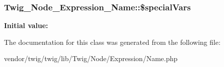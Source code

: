 \subsubsection[{\texorpdfstring{\$special\+Vars}{$specialVars}}]{\setlength{\rightskip}{0pt plus 5cm}Twig\+\_\+\+Node\+\_\+\+Expression\+\_\+\+Name\+::\$special\+Vars\hspace{0.3cm}{\ttfamily [protected]}}\hypertarget{classTwig__Node__Expression__Name_a934d8c519b8997a7880693992464975c}{}\label{classTwig__Node__Expression__Name_a934d8c519b8997a7880693992464975c}
{\bfseries Initial value\+:}


The documentation for this class was generated from the following file\+:\begin{DoxyCompactItemize}
\item 
vendor/twig/twig/lib/\+Twig/\+Node/\+Expression/Name.\+php\end{DoxyCompactItemize}
